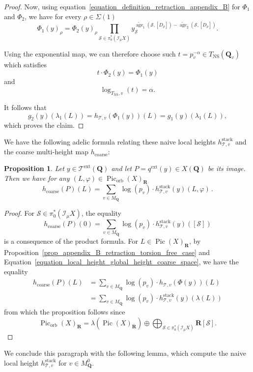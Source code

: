 \documentclass{proc-l}
\newcommand{\R}{\mathbf{R}}
\newcommand{\Q}{\mathbf{Q}}
\DeclareMathOperator{\Pic}{Pic}
\DeclareMathOperator{\stack}{stack}
\DeclareMathOperator{\age}{age}
\DeclareMathOperator{\NS}{NS}
\DeclareMathOperator{\coarse}{coarse}
\DeclareMathOperator{\orb}{orb}
\DeclareMathOperator{\ext}{ext}
\newcommand{\stackS}{\mathcal{S}}
\newcommand{\stackT}{\mathcal{T}}
\newcommand{\sheafI}{\mathcal{I}}
\newcommand{\twistsector}{\pi_0^*(\sheafI_{\mu} X)}
\newtheorem{prop}[theorem]{Proposition}
\theoremstyle{definition}
\theoremstyle{remark}
\numberwithin{equation}{section}
\begin{document}
\begin{proof}
Now, using equation~\eqref{equation_definition_retraction_appendix_B} for $\Phi_1$ and $\Phi_2$, we have for every $\rho \in \Sigma(1)$
$$
\Phi_1(y)_{\rho}
=
\Phi_2(y)_{\rho}
\prod_{\stackS \in \twistsector}
y_{\stackS}^{\widetilde{\age}_1(\stackS,[D_{\rho}])-\widetilde{\age}_2(\stackS,[D_{\rho}])}.
$$

Using the exponential map, we can therefore choose such $t = p_v^{-\alpha} \in T_{\NS}(\Q_v)$ which satisfies
$$
t \cdot \Phi_2(y) = \Phi_1(y)
$$
and
$$
\log_{T_{\NS},v}(t) = \alpha .
$$

It follows that
$$
g_2(y)(\lambda_1(L))
=
h_{\stackT,v}(\Phi_1(y))(L)
=
g_1(y)(\lambda_1(L)),
$$
which proves the claim.
\end{proof}

We have the following adelic formula relating these naive local heights $h_{\stackT,v}^{\stack}$ and the coarse multi-height map $h_{\coarse}$:

\begin{prop}\label{proposition_appendix_b_coarse_height_naive_local_height}
    Let $y \in \stackT^{\ext}(\Q)$ and let $P = q^{\ext}(y) \in X(\Q)$ be its image. Then we have for any $(L,\varphi) \in \Pic_{\orb}(X)_{\R}$
    \[
        h_{\coarse}(P)(L) = \sum\limits_{v \in M_{\Q}} \log(p_v) \cdot h_{\stackT,v}^{\stack}(y)(L,\varphi) \, .
    \]
\end{prop}

\begin{proof}
For $\stackS \in \twistsector$, the equality $$h_{\coarse}(P)(0) = \sum\limits_{v \in M_{\Q}} \log(p_v) \cdot h_{\stackT,v}^{\stack}(y)([\stackS]) $$is a consequence of the product formula. For $L \in \Pic(X)_{\R}$, by Proposition~\ref{prop_appendix_B_retraction_torsion_free_case} and Equation~\eqref{equation_local_height_global_height_coarse_space}, we have the equality
\begin{align*}
h_{\coarse}(P)(L) &= \sum\limits_{v \in M_{\Q}} \log(p_v) \cdot h_{\stackT,v}(\Phi(y))(L) \\
&= \sum\limits_{v \in M_{\Q}} \log(p_v) \cdot  h_{\stackT,v}^{\stack}(y)(\lambda(L)) 
\end{align*}from which the proposition follows since $$\Pic_{\orb}(X)_{\R}
=
\lambda\left(\Pic(X)_{\R}\right)
\oplus
\bigoplus_{\stackS \in \twistsector} \R [\stackS].$$
\end{proof}

We conclude this paragraph with the following lemma, which compute the naive local height $h_{\stackT,v}^{\stack}$ for $v \in M_{\Q}^0$.
\end{document}
